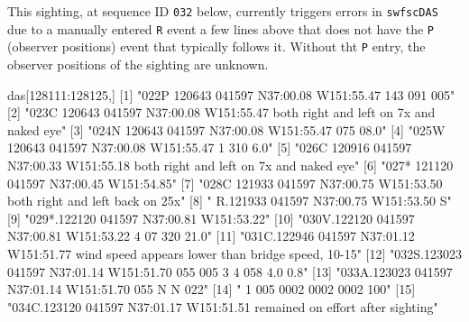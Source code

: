 \documentclass[
]{book}
\newenvironment{Shaded}{\begin{snugshade}}{\end{snugshade}}
\newcommand{\DecValTok}[1]{\textcolor[rgb]{0.00,0.00,0.81}{#1}}
\newcommand{\NormalTok}[1]{#1}
\newcommand{\SpecialCharTok}[1]{\textcolor[rgb]{0.00,0.00,0.00}{#1}}
\newcommand{\StringTok}[1]{\textcolor[rgb]{0.31,0.60,0.02}{#1}}
\begin{document}
This sighting, at sequence ID \texttt{032} below, currently triggers errors in \texttt{swfscDAS} due to a manually entered \texttt{R} event a few lines above that does not have the \texttt{P} (observer positions) event that typically follows it. Without tht \texttt{P} entry, the observer positions of the sighting are unknown.

\begin{Shaded}
\begin{Highlighting}[]
\NormalTok{das[}\DecValTok{128111}\SpecialCharTok{:}\DecValTok{128125}\NormalTok{,] }
\NormalTok{ [}\DecValTok{1}\NormalTok{] }\StringTok{"022P 120643 041597 N37:00.08 W151:55.47  143  091  005"}                                   
\NormalTok{ [}\DecValTok{2}\NormalTok{] }\StringTok{"023C 120643 041597 N37:00.08 W151:55.47 both right and left on 7x and naked eye"}          
\NormalTok{ [}\DecValTok{3}\NormalTok{] }\StringTok{"024N 120643 041597 N37:00.08 W151:55.47  075 08.0"}                                        
\NormalTok{ [}\DecValTok{4}\NormalTok{] }\StringTok{"025W 120643 041597 N37:00.08 W151:55.47    1            310  6.0"}                         
\NormalTok{ [}\DecValTok{5}\NormalTok{] }\StringTok{"026C 120916 041597 N37:00.33 W151:55.18 both right and left on 7x and naked eye"}          
\NormalTok{ [}\DecValTok{6}\NormalTok{] }\StringTok{"027* 121120 041597 N37:00.45 W151:54.85"}                                                  
\NormalTok{ [}\DecValTok{7}\NormalTok{] }\StringTok{"028C 121933 041597 N37:00.75 W151:53.50 both right and left back on 25x"}                  
\NormalTok{ [}\DecValTok{8}\NormalTok{] }\StringTok{"   R.121933 041597 N37:00.75 W151:53.50    S"}                                             
\NormalTok{ [}\DecValTok{9}\NormalTok{] }\StringTok{"029*.122120 041597 N37:00.81 W151:53.22"}                                                  
\NormalTok{[}\DecValTok{10}\NormalTok{] }\StringTok{"030V.122120 041597 N37:00.81 W151:53.22    4   07  320      21.0"}                         
\NormalTok{[}\DecValTok{11}\NormalTok{] }\StringTok{"031C.122946 041597 N37:01.12 W151:51.77 wind speed appears lower than bridge speed, 10{-}15"}
\NormalTok{[}\DecValTok{12}\NormalTok{] }\StringTok{"032S.123023 041597 N37:01.14 W151:51.70  055  005    3    4  058  4.0  0.8"}               
\NormalTok{[}\DecValTok{13}\NormalTok{] }\StringTok{"033A.123023 041597 N37:01.14 W151:51.70  055         N    N  022"}                         
\NormalTok{[}\DecValTok{14}\NormalTok{] }\StringTok{"   1                                     005 0002 0002 0002  100"}                         
\NormalTok{[}\DecValTok{15}\NormalTok{] }\StringTok{"034C.123120 041597 N37:01.17 W151:51.51  remained on effort after sighting"}               
\end{Highlighting}
\end{Shaded}
\end{document}
